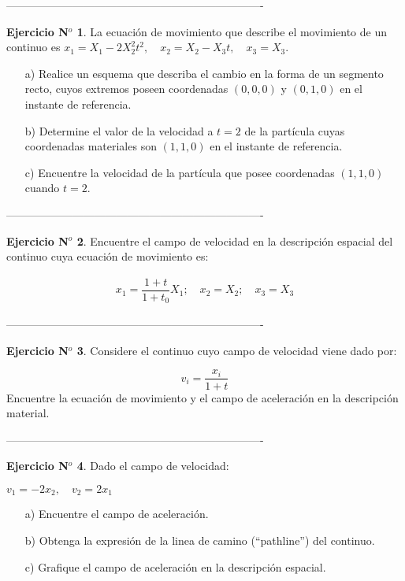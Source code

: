 \documentclass[11pt,a4paper]{article}
\theoremstyle{definition}
\newtheorem{example}{Ejercicio N$^o$}
\begin{document}
\center ----------------------------------------------------------------------


\begin{example}

La ecuación de movimiento que describe el movimiento de un continuo es $x_1=X_1-2 X_2^2 t^2, \quad x_2=X_2-X_3 t, \quad x_3=X_3$.

\begin{itemize}
\item[a)] Realice un esquema que describa el cambio en la forma de un segmento recto, cuyos extremos poseen coordenadas $(0,0,0)$ y $(0,1,0)$ en el instante de referencia.
\item[b)] Determine el valor de la velocidad a $t=2$ de la partícula cuyas coordenadas materiales son $(1,1,0)$ en el instante de referencia.
\item[c)] Encuentre la velocidad de la partícula que posee coordenadas $(1,1,0)$ cuando $t=2$.
\end{itemize}

\end{example}


\pagebreak

\center ----------------------------------------------------------------------
\begin{example}
Encuentre el campo de velocidad en la descripci\'on espacial del continuo cuya ecuaci\'on de movimiento es:

\begin{align*}
x_1=\dfrac{1+t}{1+t_0}X_1;  \quad x_2=X_2;  \quad x_3=X_3 
\end{align*}
\end{example}

\center ----------------------------------------------------------------------




\begin{example}
Considere el continuo cuyo campo de velocidad viene dado por:

\begin{equation} \nonumber
v_i=\dfrac{x_i}{1+t}
\end{equation}
\noindent Encuentre la ecuaci\'on de movimiento y el campo de aceleraci\'on en la descripci\'on material.
\end{example}

\center ----------------------------------------------------------------------

\begin{example}
Dado el campo de velocidad:

\center $v_1=-2x_2, \quad v_2=2x_1$

\begin{itemize}
\item[a)] Encuentre el campo de aceleraci\'on.
\item[b)] Obtenga la expresi\'on de la linea de camino (``pathline'') del continuo. 
\item[c)] Grafique el campo de aceleración en la descripción espacial.
\end{itemize}
\end{example}
\end{document}
